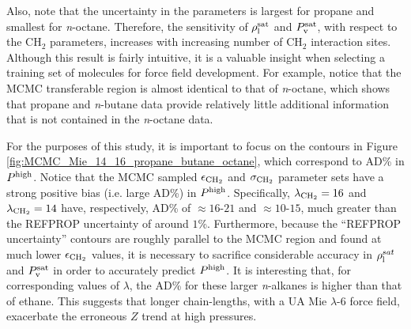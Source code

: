 \documentclass[preprint,letterpaper,floatfix,citeautoscript,aip,jcp]{revtex4-1}
\begin{document}
Also, note that the uncertainty in the parameters is largest for propane and smallest for \textit{n}-octane. Therefore, the sensitivity of $\rho_{\rm l}^{\rm sat}$ and $P_{\rm v}^{\rm sat}$, with respect to the CH$_2$ parameters, increases with increasing number of CH$_2$ interaction sites. Although this result is fairly intuitive, it is a valuable insight when selecting a training set of molecules for force field development. For example, notice that the MCMC transferable region is almost identical to that of \textit{n}-octane, which shows that propane and \textit{n}-butane data provide relatively little additional information that is not contained in the \textit{n}-octane data. 

For the purposes of this study, it is important to focus on the contours in Figure \ref{fig:MCMC_Mie_14_16_propane_butane_octane}, which correspond to AD\% in $P^{\rm high}$. Notice that the MCMC sampled $\epsilon_{\rm CH_2}$ and $\sigma_{\rm CH_2}$ parameter sets have a strong positive bias (i.e. large AD\%) in $P^{\rm high}$. Specifically, $\lambda_{\rm CH_2} = 16$ and $\lambda_{\rm CH_2} = 14$ have, respectively, AD\% of $\approx 16$-$21$ and $\approx 10$-$15$, much greater than the REFPROP uncertainty of around $1$\%. 
Furthermore, because the ``REFPROP uncertainty'' contours are roughly parallel to the MCMC region and found at much lower $\epsilon_{\rm CH_2}$ values, it is necessary to sacrifice considerable accuracy in $\rho_{\rm l}^{sat}$ and $P_{\rm v}^{\rm sat}$ in order to accurately predict $P^{\rm high}$. 
It is interesting that, for corresponding values of $\lambda$, the AD\% for these larger \textit{n}-alkanes is higher than that of ethane. This suggests that longer chain-lengths, with a UA Mie $\lambda$-6 force field, exacerbate the erroneous $Z$ trend at high pressures.

\end{document}
